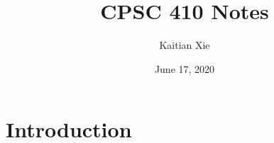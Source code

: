 \documentclass{article}
\title{CPSC 410 Notes}
\author{Kaitian Xie}
\date{June 17, 2020}
\begin{document}
\maketitle
\pagebreak

\tableofcontents
\pagebreak

\section{Introduction}
\end{document}
